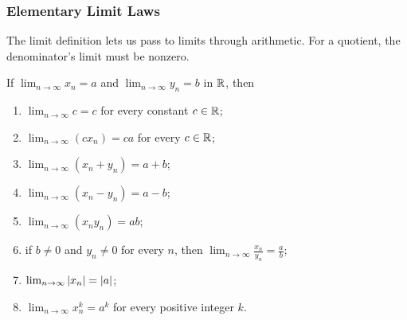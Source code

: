 \subsubsection{Elementary Limit Laws}
The limit definition lets us pass to limits through arithmetic. For a quotient, the denominator's limit must be nonzero.
\begin{theorem}\label{thm:limit-laws}
    If $\lim_{n\to\infty}x_n=a$ and $\lim_{n\to\infty}y_n=b$ in $\mathbb{R}$, then
    \begin{enumerate}
        \item[(i)] $\lim_{n\to\infty}c=c$ for every constant $c\in\mathbb{R}$;
        \item[(ii)] $\lim_{n\to\infty}(cx_n)=ca$ for every $c\in\mathbb{R}$;
        \item[(iii)] $\lim_{n\to\infty}(x_n+y_n)=a+b$;
        \item[(iv)] $\lim_{n\to\infty}(x_n-y_n)=a-b$;
        \item[(v)] $\lim_{n\to\infty}(x_ny_n)=ab$;
        \item[(vi)] if $b\ne0$ and $y_n\ne0$ for every $n$, then
            $\lim_{n\to\infty}\frac{x_n}{y_n}=\frac ab$;
        \item[(vii)] $\lim_{n\to\infty}\left|x_n\right|=\left|a\right|$;
        \item[(viii)] $\lim_{n\to\infty}x_n^k=a^k$ for every positive integer $k$.
    \end{enumerate}
\end{theorem}
